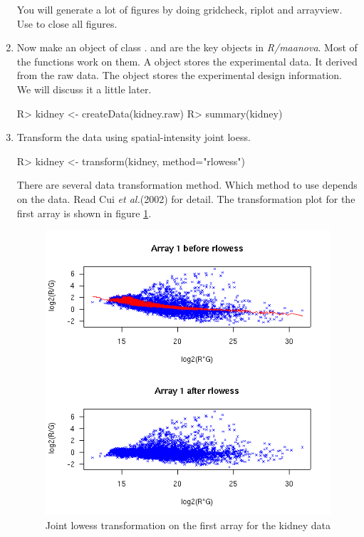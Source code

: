 \begin{enumerate}
You will generate a lot of figures by doing 
gridcheck, riplot and arrayview. Use
 to close all figures.

\item Now make an object of class .
 and 
are the key objects in {\em R/maanova}. Most of the functions work on
them. A  object stores the experimental data. It derived
from the raw data. The  object stores the experimental 
design information. We will discuss it a little later.
\begin{Sinput}
R> kidney <- createData(kidney.raw)
R> summary(kidney)
\end{Sinput}

\item Transform the data using spatial-intensity joint loess.
\begin{Sinput}
R> kidney <- transform(kidney, method="rlowess")
\end{Sinput}

There are several data transformation method. Which method to use depends on
the data. Read Cui {\it et al.}(2002) for detail. The transformation
plot for the first array is shown in figure \ref{fig:lowess}.

\begin{figure}[htbp]
\centering
\includegraphics{rlowess.png}
\caption{Joint lowess transformation on the first array for the kidney data}
\label{fig:lowess}
\end{figure}


\end{enumerate}
